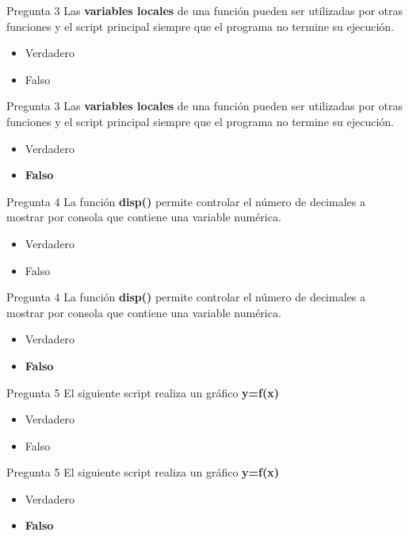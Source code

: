 \documentclass{bredelebeamer}
\begin{document}
\begin{frame}{Pregunta 3}
Las \textbf{variables locales} de una función pueden ser utilizadas por otras funciones y el script principal siempre que el programa no termine su ejecución.
\begin{itemize}
\item Verdadero
\item Falso
\end{itemize}
\end{frame}

\begin{frame}{Pregunta 3}
Las \textbf{variables locales} de una función pueden ser utilizadas por otras funciones y el script principal siempre que el programa no termine su ejecución.
\begin{itemize}
\item Verdadero
\item \textbf{Falso}
\end{itemize}
\end{frame}

\begin{frame}{Pregunta 4}
La función \textbf{disp()} permite controlar el número de decimales a mostrar por consola que contiene una variable numérica.
\begin{itemize}
\item Verdadero
\item Falso
\end{itemize}
\end{frame}

\begin{frame}{Pregunta 4}
La función \textbf{disp()} permite controlar el número de decimales a mostrar por consola que contiene una variable numérica.
\begin{itemize}
\item Verdadero
\item \textbf{Falso}
\end{itemize}
\end{frame}

\begin{frame}{Pregunta 5}
El siguiente script realiza un gráfico \textbf{y=f(x)} 

\begin{itemize}
\item Verdadero
\item Falso
\end{itemize}
\end{frame}

\begin{frame}{Pregunta 5}
El siguiente script realiza un gráfico \textbf{y=f(x)} 

\begin{itemize}
\item Verdadero
\item \textbf{Falso}
\end{itemize}
\end{frame}
\end{document}
